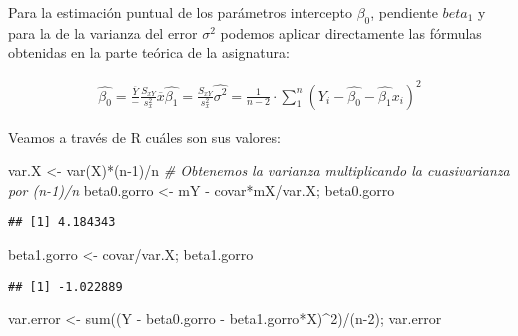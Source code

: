 \documentclass[
]{article}
\newenvironment{Shaded}{\begin{snugshade}}{\end{snugshade}}
\newcommand{\CommentTok}[1]{\textcolor[rgb]{0.56,0.35,0.01}{\textit{#1}}}
\newcommand{\DecValTok}[1]{\textcolor[rgb]{0.00,0.00,0.81}{#1}}
\newcommand{\FunctionTok}[1]{\textcolor[rgb]{0.00,0.00,0.00}{#1}}
\newcommand{\NormalTok}[1]{#1}
\newcommand{\OtherTok}[1]{\textcolor[rgb]{0.56,0.35,0.01}{#1}}
\newcommand{\SpecialCharTok}[1]{\textcolor[rgb]{0.00,0.00,0.00}{#1}}
\begin{document}
Para la estimación puntual de los parámetros intercepto \(\beta_0\),
pendiente \(beta_1\) y para la de la varianza del error \(\sigma^2\)
podemos aplicar directamente las fórmulas obtenidas en la parte teórica
de la asignatura:

\begin{gather*}
\hat{\beta_0} = \frac{\overline{Y}} - \frac{S_{xY}}{s^2_x}\overline{x}
\hat{\beta_1} = \frac{S_{xY}}{s^2_x}
\hat{\sigma^2} = \frac{1}{n-2} \cdot \sum_{1}^{n} (Y_i - \hat{\beta_0} - \hat{\beta_1}x_i)^2
\end{gather*}

Veamos a través de R cuáles son sus valores:

\begin{Shaded}
\begin{Highlighting}[]
\NormalTok{var.X }\OtherTok{\textless{}{-}} \FunctionTok{var}\NormalTok{(X)}\SpecialCharTok{*}\NormalTok{(n}\DecValTok{{-}1}\NormalTok{)}\SpecialCharTok{/}\NormalTok{n           }\CommentTok{\# Obtenemos la varianza multiplicando la cuasivarianza por (n{-}1)/n}
\NormalTok{beta0.gorro }\OtherTok{\textless{}{-}}\NormalTok{ mY }\SpecialCharTok{{-}}\NormalTok{ covar}\SpecialCharTok{*}\NormalTok{mX}\SpecialCharTok{/}\NormalTok{var.X; beta0.gorro}
\end{Highlighting}
\end{Shaded}

\begin{verbatim}
## [1] 4.184343
\end{verbatim}

\begin{Shaded}
\begin{Highlighting}[]
\NormalTok{beta1.gorro }\OtherTok{\textless{}{-}}\NormalTok{ covar}\SpecialCharTok{/}\NormalTok{var.X; beta1.gorro}
\end{Highlighting}
\end{Shaded}

\begin{verbatim}
## [1] -1.022889
\end{verbatim}

\begin{Shaded}
\begin{Highlighting}[]
\NormalTok{var.error }\OtherTok{\textless{}{-}} \FunctionTok{sum}\NormalTok{((Y }\SpecialCharTok{{-}}\NormalTok{ beta0.gorro }\SpecialCharTok{{-}}\NormalTok{ beta1.gorro}\SpecialCharTok{*}\NormalTok{X)}\SpecialCharTok{\^{}}\DecValTok{2}\NormalTok{)}\SpecialCharTok{/}\NormalTok{(n}\DecValTok{{-}2}\NormalTok{); var.error}
\end{Highlighting}
\end{Shaded}
\end{document}
